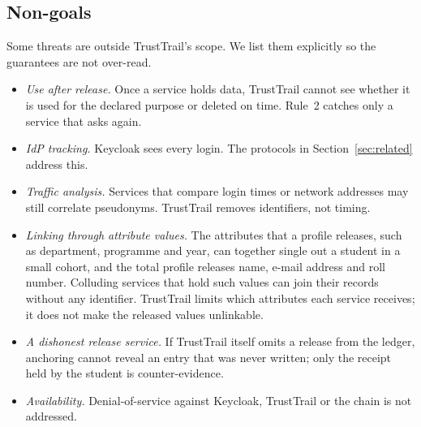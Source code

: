 \subsection{Non-goals}
Some threats are outside TrustTrail's scope. We list them explicitly so the guarantees are not over-read.
\begin{itemize}
\item \emph{Use after release.} Once a service holds data, TrustTrail cannot see whether it is used for the declared purpose or deleted on time. Rule~2 catches only a service that asks again.
\item \emph{IdP tracking.} Keycloak sees every login. The protocols in Section~\ref{sec:related} address this.
\item \emph{Traffic analysis.} Services that compare login times or network addresses may still correlate pseudonyms. TrustTrail removes identifiers, not timing.
\item \emph{Linking through attribute values.} The attributes that a profile releases, such as department, programme and year, can together single out a student in a small cohort, and the total profile releases name, e-mail address and roll number. Colluding services that hold such values can join their records without any identifier. TrustTrail limits which attributes each service receives; it does not make the released values unlinkable.
\item \emph{A dishonest release service.} If TrustTrail itself omits a release from the ledger, anchoring cannot reveal an entry that was never written; only the receipt held by the student is counter-evidence.
\item \emph{Availability.} Denial-of-service against Keycloak, TrustTrail or the chain is not addressed.
\end{itemize}
